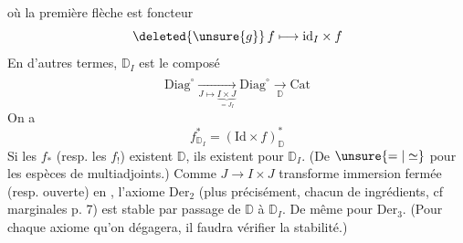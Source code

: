 où la première flèche est   foncteur
\[
\deleted{\unsure{g}}\, f\longmapsto\mathrm{id}_I\times f
\]
En d'autres termes, $\mathbb D_I$ est le composé
\[
\mathrm{Diag}^\circ
\xrightarrow[\displaystyle J\mapsto\underbrace{I\times J}_{=J_I}]{\phantom{\mathbb D}}
\mathrm{Diag}^\circ\xrightarrow[\mathbb D]{}\mathrm{Cat}
\]
On a
\[
f^*_{\mathbb D_I}=(\mathrm{Id}\times f)^*_{\mathbb D}
\]
Si les $f_*$ (resp. les $f_!$) existent  $\mathbb D$, ils existent pour $\mathbb D_I$. (De $\unsure{=|\simeq}$ pour les espèces de multiadjoints.) Comme $J\longrightarrow I\times J$ transforme immersion fermée (resp. ouverte) en , l'axiome $\mathrm{Der}_2$ (plus précisément, chacun de  ingrédients, cf  marginales p. 7) est stable par passage de $\mathbb D$ à $\mathbb D_I$. De même pour $\mathrm{Der}_3$. (Pour chaque  axiome qu'on dégagera, il faudra vérifier la stabilité.)
